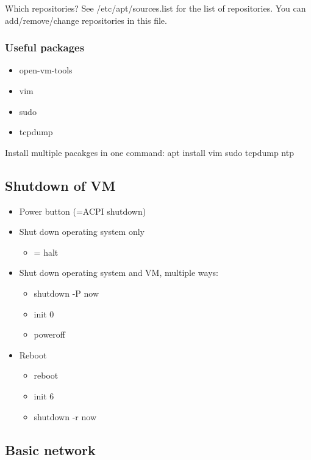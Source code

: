 \documentclass{article}
\begin{document}
Which repositories? See /etc/apt/sources.list for the list of repositories. You can add/remove/change repositories in this file.

\subsubsection{Useful packages}

\begin{itemize}
    \item open-vm-tools
    \item vim
    \item sudo
    \item tcpdump
\end{itemize}

Install multiple pacakges in one command: apt install vim sudo tcpdump ntp

\subsection{Shutdown of VM}

\begin{itemize}
    \item Power button (=ACPI shutdown)
    \item Shut down operating system only
    \begin{itemize}
        \item = halt
    \end{itemize}
    \item Shut down operating system and VM, multiple ways:
    \begin{itemize}
        \item shutdown -P now
        \item init 0
        \item poweroff
    \end{itemize}
    \item Reboot
    \begin{itemize}
        \item reboot
        \item init 6
        \item shutdown -r now
    \end{itemize}
\end{itemize}

\subsection{Basic network}
\end{document}
